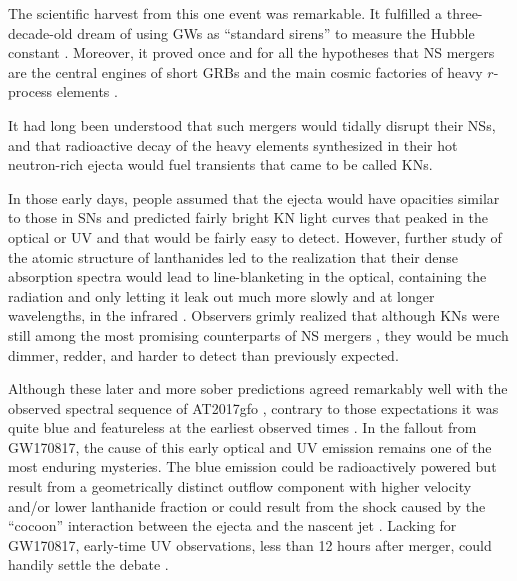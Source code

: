 \documentclass[twocolumn,times]{aastex631}
\begin{document}
The scientific harvest from this one event was remarkable. It fulfilled a three-decade-old dream of using \acp{GW} as ``standard sirens'' to measure the Hubble constant \citep{1986Natur.323..310S,2017Natur.551...85A}. Moreover, it proved once and for all the hypotheses that \ac{NS} mergers are the central engines of short \acp{GRB} \citep{2013ApJ...776...18F} and the main cosmic factories of heavy $r$-process elements \citep{1999ApJ...525L.121F}. 

It had long been understood that such mergers would tidally disrupt their \acp{NS}, and that radioactive decay of the heavy elements synthesized in their hot neutron-rich ejecta would fuel transients \citep{1974ApJ...192L.145L,1989Natur.340..126E,1998ApJ...507L..59L} that came to be called \acp{KN}.

In those early days, people assumed that the ejecta would have opacities similar to those in \acp{SN} and predicted fairly bright \ac{KN} light curves that peaked in the optical or \ac{UV} and that would be fairly easy to detect. However, further study of the atomic structure of lanthanides led to the realization that their dense absorption spectra would lead to line-blanketing in the optical, containing the radiation and only letting it leak out much more slowly and at longer wavelengths, in the infrared \citep{2013ApJ...774...25K}. Observers grimly realized that although \acp{KN} were still among the most promising counterparts of \ac{NS} mergers \citep{2012ApJ...746...48M}, they would be much dimmer, redder, and harder to detect than previously expected.

Although these later and more sober predictions agreed remarkably well with the observed spectral sequence of AT2017gfo \citep{2017Natur.551...67P,2017Natur.551...80K}, contrary to those expectations it was quite blue and featureless at the earliest observed times \citep{2017Sci...358.1574S}. In the fallout from GW170817, the cause of this early optical and \ac{UV} emission remains one of the most enduring mysteries. The blue emission could be radioactively powered but result from a geometrically distinct outflow component with higher velocity and/or lower lanthanide fraction \citep{2017ApJ...848L..18N} or could result from the shock caused by the ``cocoon'' interaction between the ejecta and the nascent jet \citep{2017Sci...358.1559K,2018MNRAS.479..588G}. Lacking for GW170817, early-time \ac{UV} observations, less than 12 hours after merger, could handily settle the debate \citep{2018ApJ...855L..23A}.
\end{document}
